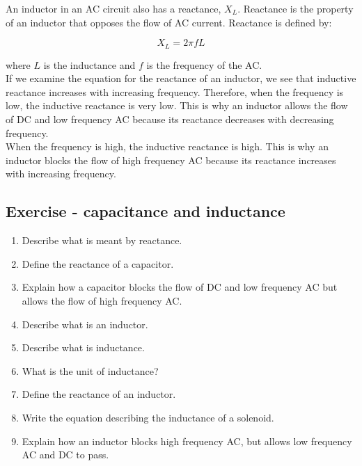 An inductor in an AC circuit also has a reactance, $X_L$. Reactance is the property of an inductor that opposes the flow of AC current. Reactance is defined by:

\begin{equation*}
X_L = 2\pi fL
\end{equation*}
 
where $L$ is the inductance and $f$ is the frequency of the AC.\\
 
If we examine the equation for the reactance of an inductor, we see that inductive reactance increases with increasing frequency. Therefore, when the frequency is low, the inductive reactance is very low. This is why an inductor allows the flow of DC and low frequency AC because its reactance decreases with decreasing frequency.\\ 
 
When the frequency is high, the inductive reactance is high. This is why an inductor blocks the flow of high frequency AC because its reactance increases with increasing frequency.

\subsection {Exercise - capacitance and inductance}
\begin{enumerate}
\item Describe what is meant by reactance.
\item Define the reactance of a capacitor.
\item Explain how a capacitor blocks the flow of DC and low frequency AC but allows the flow of high frequency AC.
\item Describe what is an inductor.
\item Describe what is inductance.
\item What is the unit of inductance?
\item Define the reactance of an inductor.
\item Write the equation describing the inductance of a solenoid.
\item Explain how an inductor blocks high frequency AC, but allows low frequency AC and DC to pass.
\end{enumerate}

